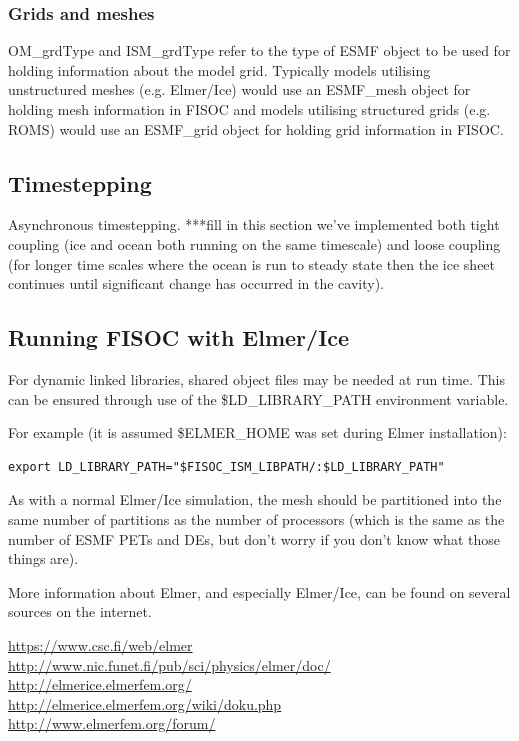 \documentclass[12pt]{article}
\begin{document}
\subsubsection{Grids and meshes}
OM\_grdType and ISM\_grdType refer to the type of ESMF object to be used for holding information about 
the model grid.  Typically models utilising unstructured meshes (e.g. Elmer/Ice) would use an 
ESMF\_mesh object for holding mesh information in FISOC and models utilising structured grids 
(e.g. ROMS) would use an ESMF\_grid object for holding grid information in FISOC.








\subsection{Timestepping}
Asynchronous timestepping.
***fill in this section we've implemented both tight coupling (ice and ocean both running 
on the same timescale) and loose coupling (for longer time scales where the ocean is run 
to steady state then the ice sheet continues until significant change has occurred in the cavity).


\subsection{Running FISOC with Elmer/Ice} 
For dynamic linked libraries, shared object files may be needed at run time.  
This can be ensured through use of 
the \$LD\_LIBRARY\_PATH environment variable. 

For example (it is assumed \$ELMER\_HOME was set during Elmer installation):
\begin{lstlisting}
export LD_LIBRARY_PATH="$FISOC_ISM_LIBPATH/:$LD_LIBRARY_PATH"
\end{lstlisting}

As with a normal Elmer/Ice simulation, the mesh should be partitioned into the 
same number of partitions as the number of processors (which is the same as the number of 
ESMF PETs and DEs, but don't worry if you don't know what those things are). 

More information about Elmer, and especially Elmer/Ice, can be found on several sources 
on the internet.

\begin{flushleft}
\url{https://www.csc.fi/web/elmer}\\
\url{http://www.nic.funet.fi/pub/sci/physics/elmer/doc/}\\
\url{http://elmerice.elmerfem.org/}\\
\url{http://elmerice.elmerfem.org/wiki/doku.php}\\
\url{http://www.elmerfem.org/forum/}\\
\end{flushleft}
\end{document}
